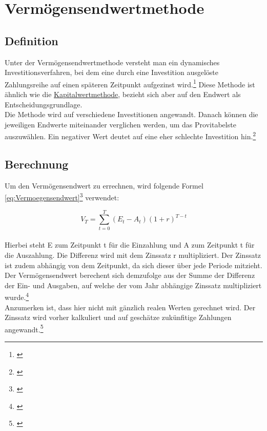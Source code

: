 \chapter{Vermögensendwertmethode}
\label{Vermoegensendwertmethode}

\section{Definition}
Unter der Vermögensendwertmethode versteht man ein dynamisches Investitionsverfahren, bei dem eine durch eine Investition ausgelöste Zahlungsreihe auf einen späteren Zeitpunkt aufgezinst wird.\footnote{\cite{finanzen-vermoegensendwertmethode}} Diese Methode ist ähnlich wie die  \hyperref[Kapitalwertmethode]{Kapitalwertmethode}, bezieht sich aber auf den Endwert als Entscheidungsgrundlage.\\
Die Methode wird auf verschiedene Investitionen angewandt. Danach können die jeweiligen Endwerte miteinander verglichen werden, um das Provitabelste auszuwählen. Ein negativer Wert deutet auf eine eher schlechte Investition hin.\footnote{\cite{bwllernen-endwertmethode}}

\section{Berechnung}
Um den Vermögensendwert zu errechnen, wird folgende Formel \eqref{eq:Vermoegensendwert}\footnote{\cite{studyflix-endwertmethode}} verwendet:

\begin{equation}
    V_T = \sum_{ t = 0 }^{ T }{(E_{ t } - A_{ t })(1 + r)^{T - t}}
    \label{eq:Vermoegensendwert}
\end{equation}
\smallskip\\
Hierbei steht E zum Zeitpunkt t für die Einzahlung und A zum Zeitpunkt t für die Auszahlung. Die Differenz wird mit dem Zinssatz r multipliziert. Der Zinssatz ist zudem abhängig von dem Zeitpunkt, da sich dieser über jede Periode mitzieht. Der Vermögensendwert berechent sich demzufolge aus der Summe der Differenz der Ein- und Ausgaben, auf welche der vom Jahr abhängige Zinssatz multipliziert wurde.\footnote{\cite{studyflix-endwertmethode}}\\

Anzumerken ist, dass hier nicht mit gänzlich realen Werten gerechnet wird. Der Zinssatz wird vorher kalkuliert und auf geschätze zukünfitige Zahlungen angewandt.\footnote{\cite{finanzen-vermoegensendwertmethode}}

